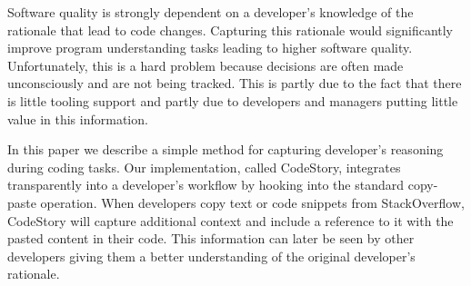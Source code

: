 \documentclass[../manifest.tex]{subfiles}
\begin{document}
Software quality is strongly dependent on a developer's knowledge of the rationale that lead to code changes. Capturing this rationale would significantly improve program understanding tasks leading to higher software quality. Unfortunately, this is a hard problem because decisions are often made unconsciously and are not being tracked. This is partly due to the fact that there is little tooling support and partly due to developers and managers putting little value in this information.

In this paper we describe a simple method for capturing developer's reasoning
during coding tasks. Our implementation, called CodeStory, integrates transparently
into a developer's workflow by hooking into the standard copy-paste operation. When developers copy text or code snippets from StackOverflow, CodeStory will capture additional context and include a reference to it with the pasted content in their code. This information can later be seen by other developers giving them a better understanding of the original developer's rationale.
\end{document}
